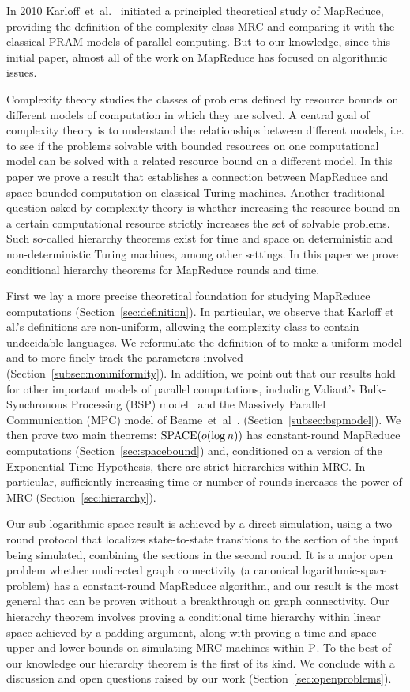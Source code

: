 \documentclass{llncs}
\newcommand{\SPACE}{\textup{SPACE}}
\renewcommand{\P}{\textup{P}}
\begin{document}
In 2010 Karloff~et~al.~\cite{Karloff10} initiated a principled theoretical
study of MapReduce, providing the definition of the complexity class MRC and
comparing it with the classical PRAM models of parallel computing. But to our
knowledge, since this initial paper, almost all of the work on MapReduce has
focused on algorithmic issues.

Complexity theory studies the classes of problems defined by resource bounds on
different models of computation in which they are solved. A central goal of
complexity theory is to understand the relationships between different models,
i.e. to see if the problems solvable with bounded resources on one
computational model can be solved with a related resource bound on a different
model.  In this paper we prove a result that establishes a connection between
MapReduce and space-bounded computation on classical Turing machines.  Another
traditional question asked by complexity theory is whether increasing the
resource bound on a certain computational resource strictly increases the set
of solvable problems. Such so-called hierarchy theorems exist for time and
space on deterministic and non-deterministic Turing machines, among other
settings.  In this paper we prove conditional hierarchy theorems for MapReduce
rounds and time.

First we lay a more precise theoretical foundation for studying MapReduce
computations (Section~\ref{sec:definition}).  In particular, we observe that
Karloff et al.'s definitions are non-uniform, allowing the complexity class to
contain undecidable languages.  We reformulate the definition of
\cite{Karloff10} to make a uniform model and to more finely track the
parameters involved (Section~\ref{subsec:nonuniformity}).  In addition, we
point out that our results hold for other important models of parallel
computations, including Valiant's Bulk-Synchronous Processing (BSP)
model~\cite{Valiant90} and the Massively Parallel Communication (MPC) model of
Beame~et~al~\cite{BeameKS13}.  (Section~\ref{subsec:bspmodel}).  We then prove
two main theorems: $\SPACE(o(\log n))$ has constant-round MapReduce
computations (Section~\ref{sec:spacebound}) and, conditioned on a version of
the Exponential Time Hypothesis, there are strict hierarchies within MRC.  In
particular, sufficiently increasing time or number of rounds increases the
power of MRC (Section~\ref{sec:hierarchy}).

Our sub-logarithmic space result is achieved by a direct simulation, using a
two-round protocol that localizes state-to-state transitions to the section of
the input being simulated, combining the sections in the second round. It is a
major open problem whether undirected graph connectivity (a canonical
logarithmic-space problem) has a constant-round MapReduce algorithm, and our
result is the most general that can be proven without a breakthrough on graph
connectivity.  Our hierarchy theorem involves proving a conditional time
hierarchy within linear space achieved by a padding argument, along with
proving a time-and-space upper and lower bounds on simulating MRC machines
within $\P$. To the best of our knowledge our hierarchy theorem is the first of
its kind. We conclude with a discussion and open questions raised by our work
(Section~\ref{sec:openproblems}).
\end{document}
